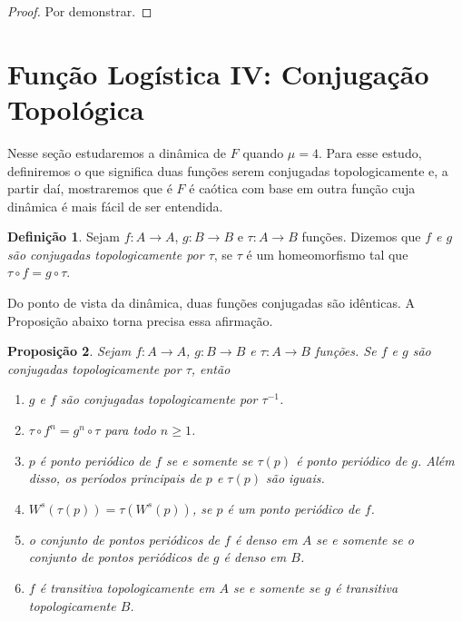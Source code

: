 \documentclass[a4paper, 12pt]{article}
\theoremstyle{definition}
\newtheorem{definition}{Definição}[section]
\theoremstyle{plain}
\newtheorem{proposition}[definition]{Proposição}
\theoremstyle{plain}
\theoremstyle{plain}
\theoremstyle{definition}
\theoremstyle{remark}
\begin{document}
\begin{proof}
Por demonstrar.
\end{proof}

\section{Função Logística IV: Conjugação Topológica}

Nesse seção estudaremos a dinâmica de $F$ quando $\mu = 4$. Para esse estudo, definiremos o que significa duas funções serem conjugadas topologicamente e, a partir daí, mostraremos que é $F$ é caótica com base em outra função cuja dinâmica é mais fácil de ser entendida.

\begin{definition}
Sejam $f: A \to A$, $g: B \to B$ e $\tau: A \to B$ funções. Dizemos que \textit{$f$ e $g$ são conjugadas topologicamente por $\tau$}, se $\tau$ é um homeomorfismo tal que $\tau \circ f = g \circ \tau$.
\end{definition}

Do ponto de vista da dinâmica, duas funções conjugadas são idênticas. A Proposição abaixo torna precisa essa afirmação.

\begin{proposition}
\label{proposition 5 1}
Sejam $f: A \to A$, $g: B \to B$ e $\tau: A \to B$ funções. Se $f$ e $g$ são conjugadas topologicamente por $\tau$, então
\begin{enumerate}
\item $g$ e $f$ são conjugadas topologicamente por $\tau^{-1}$.
\item $\tau \circ f^n = g^n \circ \tau$ para todo $n \geq 1$.
\item $p$ é ponto periódico de $f$ se e somente se $\tau(p)$ é ponto periódico de $g$. Além disso, os períodos principais de $p$ e $\tau(p)$ são iguais.
\item $W^s(\tau(p)) = \tau(W^s(p))$, se $p$ é um ponto periódico de $f$.
\item o conjunto de pontos periódicos de $f$ é denso em $A$ se e somente se o conjunto de pontos periódicos de $g$ é denso em $B$.
\item $f$ é transitiva topologicamente em $A$ se e somente se $g$ é transitiva topologicamente $B$.
\end{enumerate}
\end{proposition}
\end{document}
